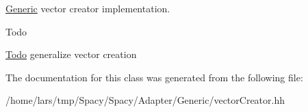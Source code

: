\hyperlink{namespaceSpacy_1_1Generic}{Generic} vector creator implementation. 

\begin{DoxyRefDesc}{Todo}
\item[\hyperlink{todo__todo000001}{Todo}]generalize vector creation \end{DoxyRefDesc}


The documentation for this class was generated from the following file\+:\begin{DoxyCompactItemize}
\item 
/home/lars/tmp/\+Spacy/\+Spacy/\+Adapter/\+Generic/vector\+Creator.\+hh\end{DoxyCompactItemize}

